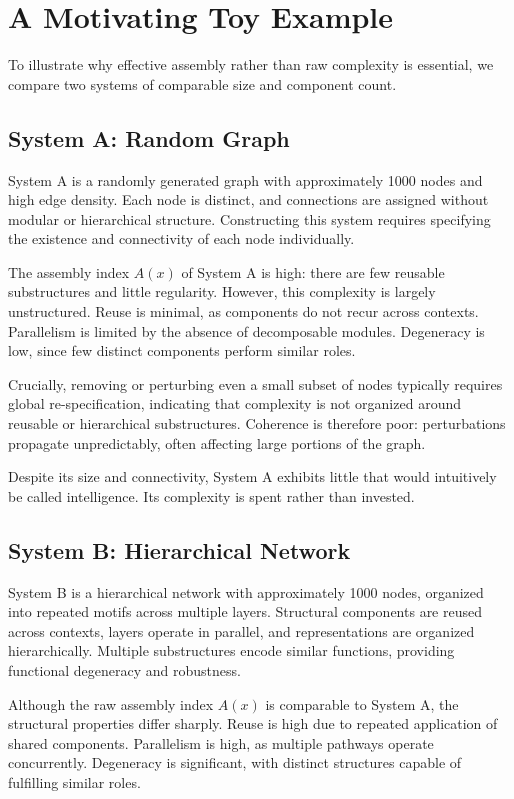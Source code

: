 \documentclass[11pt,letterpaper]{article}
\begin{document}
\section{A Motivating Toy Example}

To illustrate why effective assembly rather than raw complexity is essential, we compare two systems of comparable size and component count.

\subsection{System A: Random Graph}

System A is a randomly generated graph with approximately 1000 nodes and high edge density. Each node is distinct, and connections are assigned without modular or hierarchical structure. Constructing this system requires specifying the existence and connectivity of each node individually.

The assembly index $A(x)$ of System A is high: there are few reusable substructures and little regularity. However, this complexity is largely unstructured. Reuse is minimal, as components do not recur across contexts. Parallelism is limited by the absence of decomposable modules. Degeneracy is low, since few distinct components perform similar roles.

Crucially, removing or perturbing even a small subset of nodes typically requires global re-specification, indicating that complexity is not organized around reusable or hierarchical substructures. Coherence is therefore poor: perturbations propagate unpredictably, often affecting large portions of the graph.

Despite its size and connectivity, System A exhibits little that would intuitively be called intelligence. Its complexity is spent rather than invested.

\subsection{System B: Hierarchical Network}

System B is a hierarchical network with approximately 1000 nodes, organized into repeated motifs across multiple layers. Structural components are reused across contexts, layers operate in parallel, and representations are organized hierarchically. Multiple substructures encode similar functions, providing functional degeneracy and robustness.

Although the raw assembly index $A(x)$ is comparable to System A, the structural properties differ sharply. Reuse is high due to repeated application of shared components. Parallelism is high, as multiple pathways operate concurrently. Degeneracy is significant, with distinct structures capable of fulfilling similar roles.
\end{document}
